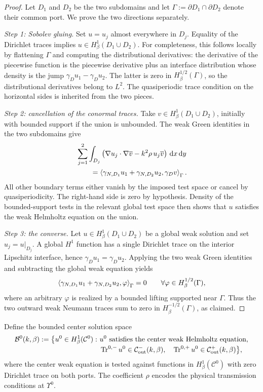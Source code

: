 \begin{proof}
Let $D_1$ and $D_2$ be the two subdomains and let
$\Gamma:=\partial D_1\cap\partial D_2$ denote their common port.  We prove
the two directions separately.

\emph{Step 1: Sobolev gluing.}
Set $u=u_j$ almost everywhere in $D_j$.  Equality of the Dirichlet traces
implies $u\in H^1_\beta(D_1\cup D_2)$.  For completeness, this follows
locally by flattening $\Gamma$ and computing the distributional derivatives:
the derivative of the piecewise function is the piecewise derivative plus an
interface distribution whose density is the jump
$\gamma_Du_1-\gamma_Du_2$.  The latter is zero in
$H^{1/2}_\beta(\Gamma)$, so the distributional derivatives belong to $L^2$.
The quasiperiodic trace condition on the horizontal sides is inherited from
the two pieces.

\emph{Step 2: cancellation of the conormal traces.}
Take $v\in H^1_\beta(D_1\cup D_2)$, initially with bounded support if the
union is unbounded.  The weak Green identities in the two subdomains give
\begin{align*}
  &\sum_{j=1}^2\int_{D_j}
  \left(\nabla u_j\cdot\nabla\overline v
  -k^2\rho\,u_j\overline v\right)\,\mathrm{d} x\,\mathrm{d} y\\
  &\qquad=
  \left\langle \gamma_{N,D_1}u_1+\gamma_{N,D_2}u_2,\gamma_Dv\right\rangle_{\Gamma}.
\end{align*}
All other boundary terms either vanish by the imposed test space or cancel
by quasiperiodicity.  The right-hand side is zero by hypothesis.  Density of
the bounded-support tests in the relevant global test space then shows that
$u$ satisfies the weak Helmholtz equation on the union.

\emph{Step 3: the converse.}
Let $u\in H^1_\beta(D_1\cup D_2)$ be a global weak solution and set
$u_j=u|_{D_j}$.  A global $H^1$ function has a single Dirichlet trace on the
interior Lipschitz interface, hence
$\gamma_Du_1=\gamma_Du_2$.  Applying the two weak Green identities and
subtracting the global weak equation yields
\[
  \left\langle \gamma_{N,D_1}u_1+\gamma_{N,D_2}u_2,\varphi\right\rangle_{\Gamma}=0
  \qquad\forall\varphi\in H^{1/2}_\beta(\Gamma),
\]
where an arbitrary $\varphi$ is realized by a bounded lifting supported near
$\Gamma$.  Thus the two outward weak Neumann traces sum to zero in
$H^{-1/2}_\beta(\Gamma)$, as claimed.
\end{proof}

Define the bounded center solution space
\begin{equation}
\begin{split}
  \mathcal B^0(k,\beta):=\bigl\{u^0\in H^1_\beta(\mathcal C^0):\ &
  u^0\text{ satisfies the center weak Helmholtz equation},\\[-0.2em]
  &\operatorname{Tr}^{0,-}u^0\in\mathcal C^-_{\mathrm{out}}(k,\beta),\quad
  \operatorname{Tr}^{0,+}u^0\in\mathcal C^+_{\mathrm{out}}(k,\beta)\bigr\},
\end{split}
\label{eq:bounded-center-space}
\end{equation}
where the center weak equation is tested against functions in
$H^1_\beta(\mathcal C^0)$ with zero Dirichlet trace on both ports.  The
coefficient $\rho$ encodes the physical transmission conditions at $\Upsilon^0$.

